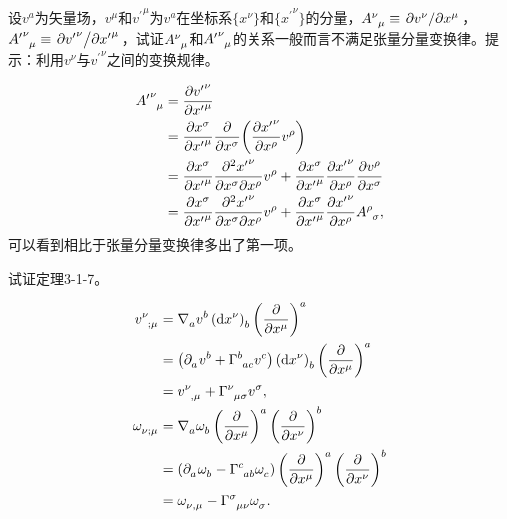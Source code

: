 \begin{xiti}
	\item 设$v^a$为矢量场，$v^\mu $和${v^\prime}^\mu$为$v^a$在坐标系$\{x^\nu\}$和$\{{x^\prime}^\nu \} $的分量，$\tensor{A}{^\nu_\mu}\equiv \pdv*{v^\nu}{x^\mu} $，$\tensor{{A^\prime}}{^\nu_\mu}\equiv \pdv*{{v^\prime}^\nu}{{x^\prime}^\mu} $，试证$\tensor{A}{^\nu_\mu}$和$\tensor{{A^\prime}}{^\nu_\mu}$的关系一般而言不满足张量分量变换律。提示：利用$v^\nu $与${v^\prime}^\nu $之间的变换规律。
	
	\begin{zm}
		\begin{align*}
		\tensor{{A^\prime}}{^\nu_\mu}=&\;\pdv{{v^\prime}^\nu}{{x^\prime}^\mu}\\
		=&\;\pdv{x^\sigma}{{x^\prime}^\mu}\pdv{x^\sigma}(\pdv{{x^\prime}^\nu}{x^\rho}v^\rho)\\
		=&\;\pdv{x^\sigma}{{x^\prime}^\mu}\pdv{{x^\prime}^\nu}{x^\sigma}{x^\rho}v^\rho +\pdv{x^\sigma}{{x^\prime}^\mu}\pdv{{x^\prime}^\nu}{x^\rho}\pdv{v^\rho}{x^\sigma}\\
		=&\;\pdv{x^\sigma}{{x^\prime}^\mu}\pdv{{x^\prime}^\nu}{x^\sigma}{x^\rho}v^\rho +\pdv{x^\sigma}{{x^\prime}^\mu}\pdv{{x^\prime}^\nu}{x^\rho}\tensor{A}{^\rho_\sigma},
		\end{align*}
		可以看到相比于张量分量变换律多出了第一项。
	\end{zm}
	
	\item 试证定理3-1-7。
	
	\begin{zm}
		\begin{align*}
		\tensor{v}{^\nu_{;\mu}}=&\; \Nabla{a}\tensor{v}{^b}\tensor{\left(\dd{x^\nu}\right)}{_b}\tensor{\left(\pdv{x^\mu}\right)}{^a}\\
		=&\tmu \left( \Partial{a}v^b+\ChristoffelSymbol{b}{a}{c}v^c \right)\tensor{\left(\dd{x^\nu}\right)}{_b}\tensor{\left(\pdv{x^\mu}\right)}{^a}\\
		=&\; \tensor{v}{^\nu_{,\mu}}+\ChristoffelSymbol{\nu}{\mu}{\sigma}\tensor{v}{^\sigma},\\
		\tensor{\omega}{_\nu_{;\mu}}=&\; \Nabla{a}\tensor{\omega}{_b}\tensor{\left(\pdv{x^\mu}\right)}{^a}\tensor{\left(\pdv{x^\nu}\right)}{^b}\\
		=&\tmu \left(\Partial{a}\tensor{\omega}{_b}-\ChristoffelSymbol{c}{a}{b}\tensor{\omega}{_c} \right)\tensor{\left(\pdv{x^\mu}\right)}{^a}\tensor{\left(\pdv{x^\nu}\right)}{^b}\\
		=&\; \tensor{\omega}{_\nu_{,\mu}}-\ChristoffelSymbol{\sigma}{\mu}{\nu}\tensor{\omega}{_\sigma}.
		\end{align*}
	\end{zm}
	

\end{xiti}
